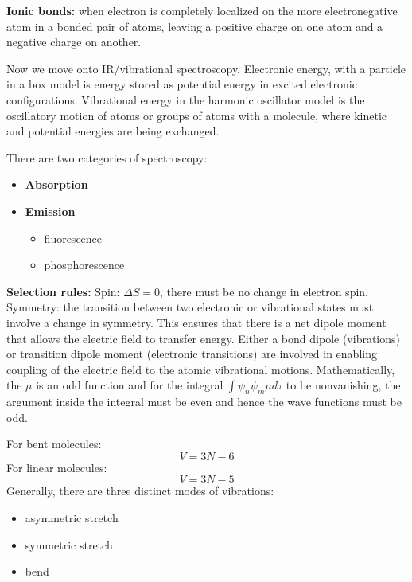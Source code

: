 \documentclass[11pt,fleqn]{book}
\begin{document}
\textbf{Ionic bonds: }when electron is completely localized on the more electronegative atom in a bonded pair of atoms, leaving a positive charge on one atom and a negative charge on another.

Now we move onto IR/vibrational spectroscopy. Electronic energy, with a particle in a box model is energy stored as potential energy in excited electronic configurations. Vibrational energy in the harmonic oscillator model is the oscillatory motion of atoms or groups of atoms with a molecule, where kinetic and potential energies are being exchanged.

There are two categories of spectroscopy:
\begin{itemize}\item \textbf{Absorption}
\item \textbf{Emission}\begin{itemize}\item fluorescence
\item phosphorescence \end{itemize} \end{itemize}


\textbf{Selection rules: } Spin: $\Delta S=0$, there must be no change in electron spin. Symmetry: the transition between two electronic or vibrational states must involve a change in symmetry. This ensures that there is a net dipole moment that allows the electric field to transfer energy. Either a bond dipole (vibrations) or transition dipole moment (electronic transitions) are involved in enabling coupling of the electric field to the atomic vibrational motions. Mathematically, the $\mu$ is an odd function and for the integral $\int\psi_n\psi_m\mu d\tau$ to be nonvanishing, the argument inside the integral must be even and hence the wave functions must be odd.

\begin{theorem}
	For bent molecules:
	$$V=3N-6$$
	For linear molecules:
	$$V=3N-5$$
	Generally, there are three distinct modes of vibrations: 
	\begin{itemize}\item asymmetric stretch
	\item symmetric stretch
	\item bend \end{itemize}
\end{theorem}
\end{document}
